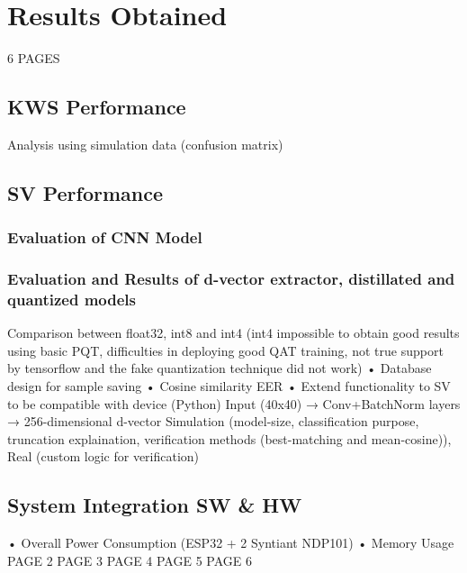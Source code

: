 \chapter{Results Obtained}
\label{cha:results obtained}

6 PAGES\newline\newline
\section{KWS Performance}
\label{sec:kws performance}
Analysis using simulation data (confusion matrix)\newline 
\section{SV Performance}
\label{sec:sv performance}
\subsection{Evaluation of CNN Model}

\subsection{Evaluation and Results of d-vector extractor, distillated and quantized models}
Comparison between float32, int8 and int4 (int4 impossible to obtain good results using basic PQT, difficulties in deploying good QAT training, not true support by tensorflow and the fake quantization technique did not work)\newline 
• Database design for sample saving \newline
• Cosine similarity EER \newline
• Extend functionality to SV to be compatible with device (Python)\newline
Input (40x40) → Conv+BatchNorm layers → 256-dimensional d-vector \newline
Simulation (model-size, classification purpose, truncation explaination, verification methods (best-matching and mean-cosine)), Real (custom logic for verification)\newline

\section{System Integration SW \& HW}
\label{sec: system integration}
• Overall Power Consumption (ESP32 + 2 Syntiant NDP101)\newline
• Memory Usage\newline
\newpage
PAGE 2
\newpage
PAGE 3
\newpage
PAGE 4
\newpage
PAGE 5
\newpage
PAGE 6
\newpage